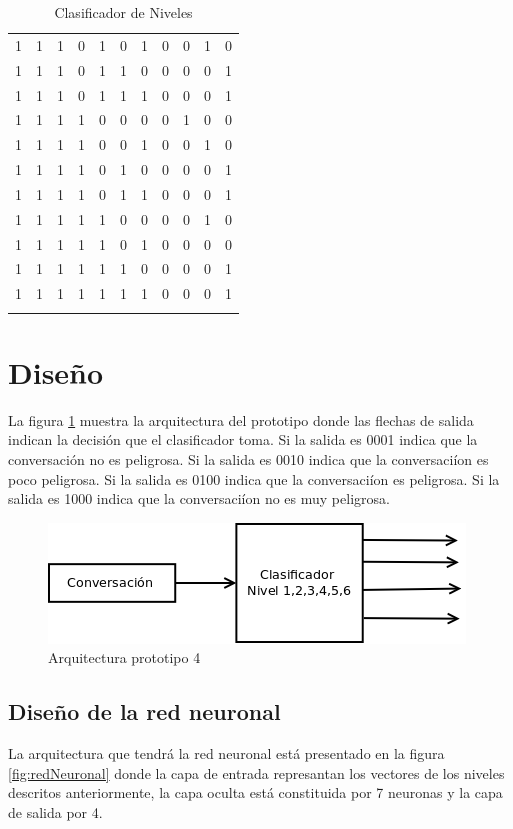 \begin{longtable}{|c|c|c|c|c|c|c|c|c|c|c|}
1 & 1 & 1 & 0 & 1 & 0 & 1 &  0 & 0 & 1 & 0 \\
1 & 1 & 1 & 0 & 1 & 1 & 0 &  0 & 0 & 0 & 1 \\
1 & 1 & 1 & 0 & 1 & 1 & 1 &  0 & 0 & 0 & 1 \\
1 & 1 & 1 & 1 & 0 & 0 & 0 &  0 & 1 & 0 & 0 \\
1 & 1 & 1 & 1 & 0 & 0 & 1 &  0 & 0 & 1 & 0 \\
1 & 1 & 1 & 1 & 0 & 1 & 0 &  0 & 0 & 0 & 1 \\
1 & 1 & 1 & 1 & 0 & 1 & 1 &  0 & 0 & 0 & 1 \\
1 & 1 & 1 & 1 & 1 & 0 & 0 &  0 & 0 & 1 & 0 \\
1 & 1 & 1 & 1 & 1 & 0 & 1 &  0 & 0 & 0 & 0 \\
1 & 1 & 1 & 1 & 1 & 1 & 0 &  0 & 0 & 0 & 1 \\ 
1 & 1 & 1 & 1 & 1 & 1 & 1 &  0 & 0 & 0 & 1 \\
\hline

\caption{Clasificador de Niveles}
\label{tab:TablaNiveles}
\end{longtable}

\section{Dise\~no}
La figura \ref{fig:arquitecturaNivel4} muestra la arquitectura del prototipo donde las flechas de salida indican la decisi\'on que el clasificador toma. Si la salida es 0001 indica que la conversaci\'on no es peligrosa. Si la salida es 0010 indica que la conversaci\'ion es poco peligrosa. Si la salida es 0100 indica que la conversaci\'ion es peligrosa. Si la salida es 1000 indica que la conversaci\'ion no es muy peligrosa.

\begin{figure}
\begin{center}
\includegraphics[scale=.5]{images/arquitecturaprotipo4}
\caption{Arquitectura prototipo 4}
\label{fig:arquitecturaNivel4}
\end{center}
\end{figure} 

\subsection{Dise\~no de la red neuronal}
La arquitectura que tendr\'a la red neuronal est\'a presentado en la figura \ref{fig:redNeuronal} donde la capa de entrada represantan los vectores de los niveles descritos anteriormente, la capa oculta est\'a constituida por 7 neuronas y la capa de salida por 4.

